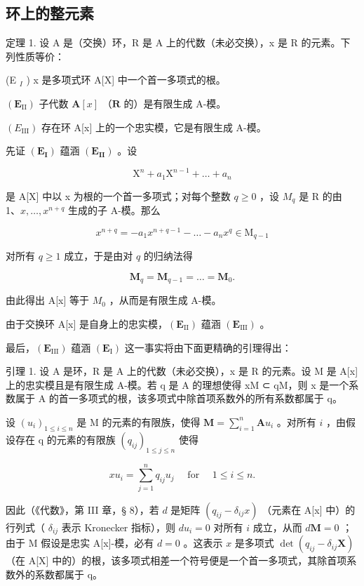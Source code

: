 \subsection{环上的整元素}

定理 1. 设 A 是（交换）环，R 是 A 上的代数（未必交换），x 是 R 的元素。下列性质等价：

(E \(_{I}\) ) x 是多项式环 A{[}X{]} 中一个首一多项式的根。

\((\mathbf{E}_{\mathrm{II}})\) 子代数 \(\mathbf{A}[x]\) （\(\mathbf{R}\) 的）是有限生成 A-模。

\((E_{\mathrm{III}})\) 存在环 A{[}x{]} 上的一个忠实模，它是有限生成 A-模。

先证 \((\mathbf{E}_{\mathbf{I}})\) 蕴涵 \((\mathbf{E}_{\mathbf{II}})\) 。设

\[
\mathrm{X} ^ {n} + a _ {1} \mathrm{X} ^ {n - 1} + \dots + a _ {n}
\]

是 A{[}X{]} 中以 x 为根的一个首一多项式；对每个整数 \(q \geqslant 0\) ，设 \(M_{q}\) 是 R 的由 1、\(x, \ldots, x^{n+q}\) 生成的子 A-模。那么

\[
x ^ {n + q} = - a _ {1} x ^ {n + q - 1} - \dots - a _ {n} x ^ {q} \in \mathrm{M} _ {q - 1}
\]

对所有 \(q \geqslant 1\) 成立，于是由对 \(q\) 的归纳法得

\[
\mathbf {M} _ {q} = \mathbf {M} _ {q - 1} = \dots = \mathbf {M} _ {0}.
\]

由此得出 A{[}x{]} 等于 \(M_{0}\) ，从而是有限生成 A-模。

由于交换环 A{[}x{]} 是自身上的忠实模，\((\mathbf{E}_{\mathrm{II}})\) 蕴涵 \((\mathbf{E}_{\mathrm{III}})\) 。

最后，\((\mathbf{E}_{\mathrm{III}})\) 蕴涵 \((\mathbf{E}_{\mathrm{I}})\) 这一事实将由下面更精确的引理得出：

引理 1. 设 A 是环，R 是 A 上的代数（未必交换），x 是 R 的元素。设 M 是 A{[}x{]} 上的忠实模且是有限生成 A-模。若 q 是 A 的理想使得 xM ⊂ qM，则 x 是一个系数属于 A 的首一多项式的根，该多项式中除首项系数外的所有系数都属于 q。

设 \((u_{i})_{1\leqslant i\leqslant n}\) 是 M 的元素的有限族，使得 \(\mathbf{M} = \sum_{i = 1}^{n}\mathbf{A}u_{i}\) 。对所有 \(i\) ，由假设存在 q 的元素的有限族 \((q_{ij})_{1\leqslant j\leqslant n}\) 使得

\[
x u _ {i} = \sum_ {j = 1} ^ {n} q _ {i j} u _ {j} \quad \text { for } \quad 1 \leqslant i \leqslant n.
\]

因此（《代数》，第 III 章，§ 8），若 \(d\) 是矩阵 \((q_{ij} - \delta_{ij}x)\) （元素在 A{[}x{]} 中）的行列式（ \(\delta_{ij}\) 表示 Kronecker 指标），则 \(du_i = 0\) 对所有 \(i\) 成立，从而 \(d\mathbf{M} = 0\) ；由于 M 假设是忠实 A{[}x{]}-模，必有 \(d = 0\) 。这表示 \(x\) 是多项式 \(\det(q_{ij} - \delta_{ij}\mathbf{X})\) （在 A{[}X{]} 中的）的根，该多项式相差一个符号便是一个首一多项式，其除首项系数外的系数都属于 q。

